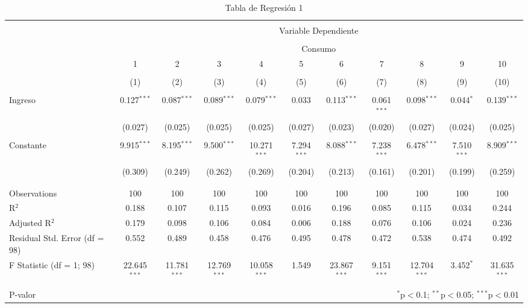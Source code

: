 \documentclass[
]{article}
\begin{document}
\begin{landscape}
\begin{table}[!htbp] \centering 
  \caption{Tabla de Regresión 1} 
  \label{} 
\footnotesize 
\begin{tabular}{@{\extracolsep{5pt}}lcccccccccc} 
\\[-1.8ex]\hline 
\hline \\[-1.8ex] 
 & \multicolumn{10}{c}{Variable Dependiente} \\ 
\cline{2-11} 
\\[-1.8ex] & \multicolumn{10}{c}{Consumo} \\ 
 & 1 & 2 & 3 & 4 & 5 & 6 & 7 & 8 & 9 & 10 \\ 
\\[-1.8ex] & (1) & (2) & (3) & (4) & (5) & (6) & (7) & (8) & (9) & (10)\\ 
\hline \\[-1.8ex] 
 Ingreso & 0.127$^{***}$ & 0.087$^{***}$ & 0.089$^{***}$ & 0.079$^{***}$ & 0.033 & 0.113$^{***}$ & 0.061$^{***}$ & 0.098$^{***}$ & 0.044$^{*}$ & 0.139$^{***}$ \\ 
  & (0.027) & (0.025) & (0.025) & (0.025) & (0.027) & (0.023) & (0.020) & (0.027) & (0.024) & (0.025) \\ 
  & & & & & & & & & & \\ 
 Constante & 9.915$^{***}$ & 8.195$^{***}$ & 9.500$^{***}$ & 10.271$^{***}$ & 7.294$^{***}$ & 8.088$^{***}$ & 7.238$^{***}$ & 6.478$^{***}$ & 7.510$^{***}$ & 8.909$^{***}$ \\ 
  & (0.309) & (0.249) & (0.262) & (0.269) & (0.204) & (0.213) & (0.161) & (0.201) & (0.199) & (0.259) \\ 
  & & & & & & & & & & \\ 
\hline \\[-1.8ex] 
Observations & 100 & 100 & 100 & 100 & 100 & 100 & 100 & 100 & 100 & 100 \\ 
R$^{2}$ & 0.188 & 0.107 & 0.115 & 0.093 & 0.016 & 0.196 & 0.085 & 0.115 & 0.034 & 0.244 \\ 
Adjusted R$^{2}$ & 0.179 & 0.098 & 0.106 & 0.084 & 0.006 & 0.188 & 0.076 & 0.106 & 0.024 & 0.236 \\ 
Residual Std. Error (df = 98) & 0.552 & 0.489 & 0.458 & 0.476 & 0.495 & 0.478 & 0.472 & 0.538 & 0.474 & 0.492 \\ 
F Statistic (df = 1; 98) & 22.645$^{***}$ & 11.781$^{***}$ & 12.769$^{***}$ & 10.058$^{***}$ & 1.549 & 23.867$^{***}$ & 9.151$^{***}$ & 12.704$^{***}$ & 3.452$^{*}$ & 31.635$^{***}$ \\ 
\hline 
\hline \\[-1.8ex] 
P-valor & \multicolumn{10}{r}{$^{*}$p$<$0.1; $^{**}$p$<$0.05; $^{***}$p$<$0.01} \\ 
\end{tabular} 
\end{table} 


\end{landscape}
\end{document}
